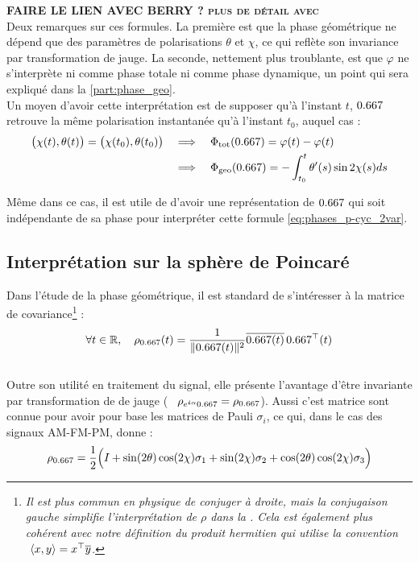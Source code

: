 \textbf{\textsc{\color{red} FAIRE LE LIEN AVEC BERRY \cite{berry_quantal_1997} ? plus de détail avec }}
\\

Deux remarques sur ces formules. 
La première est que la phase géométrique ne dépend que des paramètres de polarisations $\theta$ et $\chi$, ce qui reflète son invariance par transformation de jauge.
La seconde, nettement plus troublante, est que $\varphi$ ne s'interprète ni comme phase totale ni comme phase dynamique, un point qui sera expliqué dans la \cref{part:phase_geo}.
\\
Un moyen d'avoir cette interprétation est de supposer qu'à l'instant $t$, $\x $ retrouve la même polarisation instantanée qu'à l'instant $t_0$, auquel cas :
\begin{equation}\label{eq:phases_p-cyc_2var}
	\begin{aligned}
		\big( \chi(t), \theta(t) \big) = \big( \chi(t_0), \theta(t_0) \big)\quad 
		&\Lr\quad \phaset(\x ) = \varphi(t) - \varphi(t) \\
		&\Lr\quad \phaseg(\x ) = -\int_{t_0}^t \theta'(s) \sin 2\chi(s) ds
	\end{aligned}
\end{equation}
\skipl

Même dans ce cas, il est utile de d'avoir une représentation de $\x $ qui soit indépendante de sa phase pour interpréter cette formule \eqref{eq:phases_p-cyc_2var}.
\\



\subsection{Interprétation sur la sphère de Poincaré}\label{subsec:phase_g2Poincare}

Dans l'étude de la phase géométrique, il est standard de s'intéresser à la matrice de covariance\footnote{\itshape
	Il est plus commun en physique de conjuger à droite, mais la conjugaison gauche simplifie l'interprétation de $\rho$ dans la . Cela est également plus cohérent avec notre définition du produit hermitien qui utilise la convention $\ \langle x, y\rangle = \transp{x}\congu{y}$.
} :
\begin{equation} \label{eq:proj2x_2var}
	\forall t\in\R,\quad \rho_{\x}(t) = \frac{1}{\|\x(t) \|^2} \congu{\x(t) }\, \transp{\x}(t)
\end{equation}
\\
Outre son utilité en traitement du signal, elle présente l'avantage d'être invariante par transformation de de jauge (\ie~ $\rho_{e^{\i \alpha}\x} = \rho_{\x}$).
Aussi c'est matrice sont connue \cite{brosseau} pour avoir pour base les matrices de Pauli $\sigma_i$, ce qui, dans le cas des signaux AM-FM-PM, donne \cite{le_bihan_geometric_2024} :
\begin{equation} \label{eq:decompo_pauli}
	\rho_{\x} = \frac{1}{2}\Big( \Id + \sin(2\theta) \cos(2\chi) \sigma_1 + \sin (2\chi) \sigma_2 + \cos(2\theta) \cos(2\chi) \sigma_3 \Big)
\end{equation}


